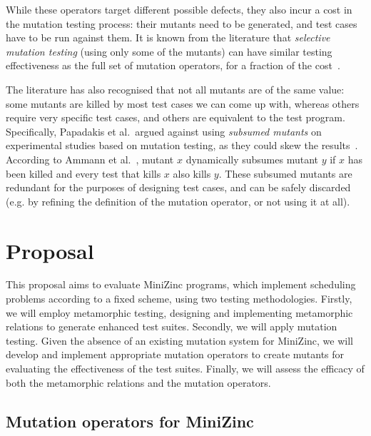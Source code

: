 While these operators target different possible defects, they also incur a cost in the mutation testing process: their mutants need to be generated, and test cases have to be run against them. It is known from the literature that \emph{selective mutation testing} (using only some of the mutants) can have similar testing effectiveness as the full set of mutation operators, for a fraction of the cost~\cite{Mresa99OpMut}.

The literature has also recognised that not all mutants are of the same value: some mutants are killed by most test cases we can come up with, whereas others require very specific test cases, and others are equivalent to the test program. Specifically, Papadakis et al.\ argued against using \emph{subsumed mutants} on experimental studies based on mutation testing, as they could skew the results~\cite{papadakis_threats_2016}. According to Ammann et al.~\cite{ammann_establishing_2014}, mutant $x$ dynamically subsumes mutant $y$ if $x$ has been killed and every test that kills $x$ also kills $y$. These subsumed mutants are redundant for the purposes of designing test cases, and can be safely discarded (e.g. by refining the definition of the mutation operator, or not using it at all).


\section{Proposal}
This proposal aims to evaluate MiniZinc programs, which implement scheduling problems according to a fixed scheme, using two testing methodologies. Firstly, we will employ metamorphic testing, designing and implementing metamorphic relations to generate enhanced test suites. Secondly, we will apply mutation testing. Given the absence of an existing mutation system for MiniZinc, we will develop and implement appropriate mutation operators to create mutants for evaluating the effectiveness of the test suites. Finally, we will assess the efficacy of both the metamorphic relations and the mutation operators.

\subsection{Mutation operators for MiniZinc}

